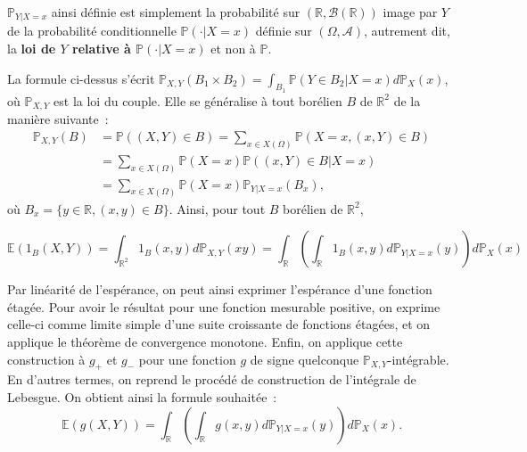 \begin{remarque}\label{III-image-de-la-probabilituxe9-conditionnelle}

\(\mathbb{P}_{Y|X=x}\) ainsi définie est simplement la probabilité sur
\((\mathbb{R},\mathcal{B}(\mathbb{R}))\) image par \(Y\) de la
probabilité conditionnelle \(\mathbb{P}(\cdot|X=x)\) définie sur
\((\Omega,\mathcal{A})\), autrement dit, la \textbf{loi de \(Y\)
relative à \(\mathbb{P}(\cdot|X=x)\)} et non à \(\mathbb{P}\).

La formule ci-dessus s'écrit
\(\mathbb{P}_{X,Y}(B_1 \times B_2) = \int_{B_1} \mathbb{P}(Y \in B_2 | X=x) d\mathbb{P}_X(x)\),
où \(\mathbb{P}_{X,Y}\) est la loi du couple. Elle se généralise à tout
borélien \(B\) de \(\mathbb{R}^2\) de la manière suivante~: \[
\begin{aligned}
\mathbb{P}_{X,Y}(B) &= \mathbb{P}((X,Y)\in B) = \sum_{x \in X(\Omega)} \mathbb{P}(X=x, (x,Y) \in B) \\
      &= \sum_{x \in X(\Omega)} \mathbb{P}(X=x) \mathbb{P}((x,Y) \in B | X=x) \\
      &= \sum_{x \in X(\Omega)} \mathbb{P}(X=x) \mathbb{P}_{Y|X=x}(B_x),
\end{aligned}
\] où \(B_x = \{y\in \mathbb{R}, (x,y) \in B\}\). Ainsi, pour tout \(B\)
borélien de \(\mathbb{R}^2\),

\[\mathbb{E}(1_B(X,Y)) = \int_{\mathbb{R}^2} 1_B(x,y)d\mathbb{P}_{X,Y}(x y) = \int_\mathbb{R}\left(\int_\mathbb{R}1_B(x,y) d\mathbb{P}_{Y|X=x}(y)\right)  d\mathbb{P}_X(x)\]

Par linéarité de l'espérance, on peut ainsi exprimer l'espérance d'une
fonction étagée. Pour avoir le résultat pour une fonction mesurable
positive, on exprime celle-ci comme limite simple d'une suite croissante
de fonctions étagées, et on applique le théorème de convergence
monotone. Enfin, on applique cette construction à \(g_+\) et \(g_-\)
pour une fonction \(g\) de signe quelconque
\(\mathbb{P}_{X,Y}\)-intégrable. En d'autres termes, on reprend le
procédé de construction de l'intégrale de Lebesgue. On obtient ainsi la
formule souhaitée~:
\[\mathbb{E}(g(X,Y)) = \int_{\mathbb{R}} \left( \int_{\mathbb{R}} g(x,y) d\mathbb{P}_{Y|X=x}(y)\right) d\mathbb{P}_X(x).\]
\end{remarque}

